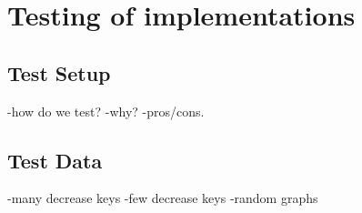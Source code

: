 \section*{Testing of implementations}
\subsection*{Test Setup}
 -how do we test?
 -why?
 -pros/cons.

\subsection*{Test Data}
 -many decrease keys
 -few decrease keys
 -random graphs
